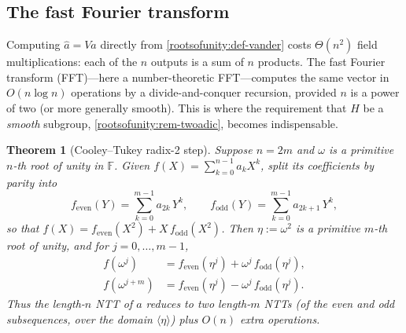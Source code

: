 \documentclass[11pt,a4paper]{article}
\newtheorem{theorem}{Theorem}[section]
\theoremstyle{definition}
\theoremstyle{remark}
\newcommand{\F}{\ensuremath{\mathbb{F}}}
\begin{document}
\subsection{The fast Fourier transform}

Computing \(\hat a = Va\) directly from \cref{rootsofunity:def-vander} costs \(\Theta(n^2)\) field multiplications: each of the \(n\) outputs is a sum of \(n\) products. The fast Fourier transform (FFT)---here a number-theoretic FFT---computes the same vector in \(O(n\log n)\) operations by a divide-and-conquer recursion, provided \(n\) is a power of two (or more generally smooth). This is where the requirement that \(H\) be a \emph{smooth} subgroup, \cref{rootsofunity:rem-twoadic}, becomes indispensable.

\begin{theorem}[Cooley--Tukey radix-2 step]\label{rootsofunity:thm-fft}
Suppose \(n = 2m\) and \(\omega\) is a primitive \(n\)-th root of unity in \(\F\). Given \(f(X) = \sum_{k=0}^{n-1} a_k X^k\), split its coefficients by parity into
\[
  f_{\mathrm{even}}(Y) = \sum_{k=0}^{m-1} a_{2k}\,Y^k, \qquad
  f_{\mathrm{odd}}(Y) = \sum_{k=0}^{m-1} a_{2k+1}\,Y^k,
\]
so that \(f(X) = f_{\mathrm{even}}(X^2) + X\, f_{\mathrm{odd}}(X^2)\). Then \(\eta := \omega^2\) is a primitive \(m\)-th root of unity, and for \(j = 0,\dots,m-1\),
\begin{align}
  f(\omega^{j}) &= f_{\mathrm{even}}(\eta^{j}) + \omega^{j}\, f_{\mathrm{odd}}(\eta^{j}), \label{rootsofunity:eq-fftbutter1}\\
  f(\omega^{j+m}) &= f_{\mathrm{even}}(\eta^{j}) - \omega^{j}\, f_{\mathrm{odd}}(\eta^{j}). \label{rootsofunity:eq-fftbutter2}
\end{align}
Thus the length-\(n\) NTT of \(a\) reduces to two length-\(m\) NTTs (of the even and odd subsequences, over the domain \(\langle\eta\rangle\)) plus \(O(n)\) extra operations.
\end{theorem}
\end{document}
